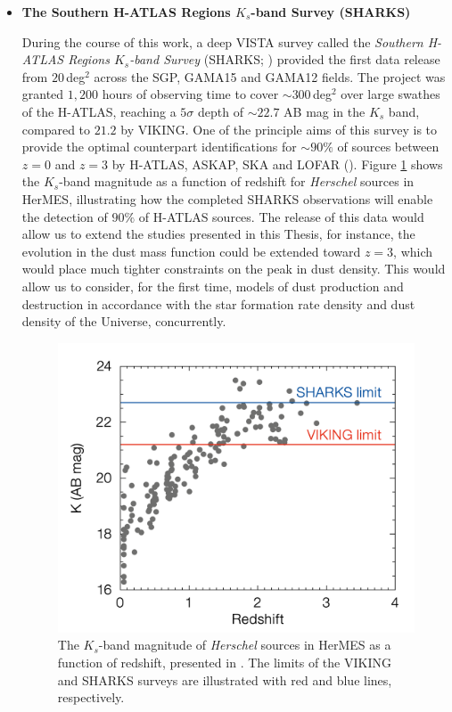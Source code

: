 \begin{itemize}
\item \textbf{The Southern H-ATLAS Regions $K_s$-band Survey (SHARKS)}

During the course of this work, a deep VISTA survey called the \textit{Southern H-ATLAS Regions $K_s$-band Survey} (SHARKS; \citealt{Dannerbauer_2022}) provided the first data release from $20\,$deg$^2$ across the SGP, GAMA15 and GAMA12 fields. The project was granted $1,200$ hours of observing time to cover $\sim 300\,$deg$^2$ over large swathes of the H-ATLAS, reaching a $5\sigma$ depth of $\sim22.7$ AB mag in the $K_s$ band, compared to $21.2$ by VIKING. One of the principle aims of this survey is to provide the optimal counterpart identifications for $\sim90\%$ of sources between $z=0$ and $z=3$ by H-ATLAS, ASKAP, SKA and LOFAR (\citealt{Dannerbauer_2022}). Figure \ref{fig:SHARKS_depth} shows the $K_s$-band magnitude as a function of redshift for \textit{Herschel} sources in HerMES, illustrating how the completed SHARKS observations will enable the detection of $90\%$ of H-ATLAS sources. The release of this data would allow us to extend the studies presented in this Thesis, for instance, the evolution in the dust mass function could be extended toward $z = 3$, which would place much tighter constraints on the peak in dust density. This would allow us to consider, for the first time, models of dust production and destruction in accordance with the star formation rate density and dust density of the Universe, concurrently.

\begin{figure}
    \centering
	\includegraphics[width=0.75\columnwidth]{Figures/SHAKRS_depth.pdf}
	\caption[$K_s$-band magnitude of HerMES sources as a function of redshift]{The $K_s$-band magnitude of \textit{Herschel} sources in HerMES as a function of redshift, presented in \citealt{Dannerbauer_2022}. The limits of the VIKING and SHARKS surveys are illustrated with red and blue lines, respectively.}
	\label{fig:SHARKS_depth}
\end{figure}


\end{itemize}
